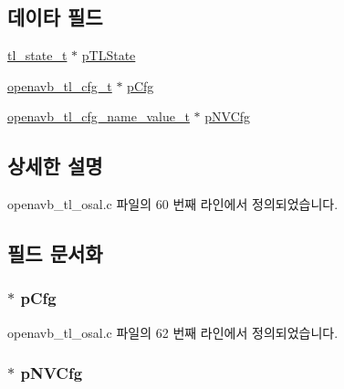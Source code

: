 \subsection*{데이타 필드}
\begin{DoxyCompactItemize}
\item 
\hyperlink{structtl__state__t}{tl\+\_\+state\+\_\+t} $\ast$ \hyperlink{structparse__ini__data__t_a442eb370b9ed2c74607fcaaecc9fef2a}{p\+T\+L\+State}
\item 
\hyperlink{structopenavb__tl__cfg__t}{openavb\+\_\+tl\+\_\+cfg\+\_\+t} $\ast$ \hyperlink{structparse__ini__data__t_ab09df5e0b48b75d02fb95aa34ce8425d}{p\+Cfg}
\item 
\hyperlink{structopenavb__tl__cfg__name__value__t}{openavb\+\_\+tl\+\_\+cfg\+\_\+name\+\_\+value\+\_\+t} $\ast$ \hyperlink{structparse__ini__data__t_a90d24217d9f037a36dd3c844f1229231}{p\+N\+V\+Cfg}
\end{DoxyCompactItemize}


\subsection{상세한 설명}


openavb\+\_\+tl\+\_\+osal.\+c 파일의 60 번째 라인에서 정의되었습니다.



\subsection{필드 문서화}
\subsubsection[{\texorpdfstring{p\+Cfg}{pCfg}}]{$\ast$ p\+Cfg}\hypertarget{structparse__ini__data__t_ab09df5e0b48b75d02fb95aa34ce8425d}{}\label{structparse__ini__data__t_ab09df5e0b48b75d02fb95aa34ce8425d}


openavb\+\_\+tl\+\_\+osal.\+c 파일의 62 번째 라인에서 정의되었습니다.

\subsubsection[{\texorpdfstring{p\+N\+V\+Cfg}{pNVCfg}}]{$\ast$ p\+N\+V\+Cfg}\hypertarget{structparse__ini__data__t_a90d24217d9f037a36dd3c844f1229231}{}\label{structparse__ini__data__t_a90d24217d9f037a36dd3c844f1229231}


